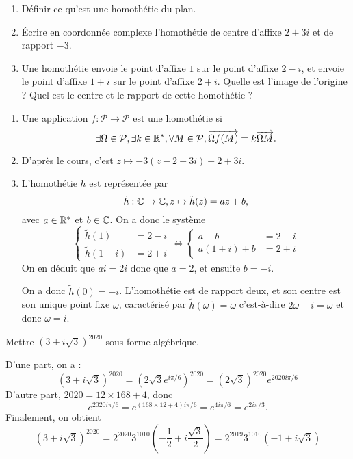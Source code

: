 \begin{exo}
\begin{enumerate}
\item Définir ce qu'est une homothétie du plan.
\item Écrire en coordonnée complexe l'homothétie de centre d'affixe $2+3i$ et de rapport $-3$.
\item Une homothétie envoie le point d'affixe $1$ sur le point d'affixe $2-i$, et envoie le point d'affixe $1+i$ sur le point d'affixe $2+i$. Quelle est l'image de l'origine ? Quel est le centre et le rapport de cette homothétie ?
\end{enumerate}
\begin{sol}
\begin{enumerate}
\item Une application $f : \mathcal P\to \mathcal P$ est une homothétie si
\[ \exists \Omega\in\mathcal P, \exists k\in\mathbb{R}^*, \forall M\in\mathcal P, \overrightarrow{\Omega f(M)}=k\overrightarrow{\Omega M}.\]
\item D'après le cours, c'est  $z\mapsto -3(z-2-3i)+2+3i$.
\item L'homothétie $h$ est représentée par 
\[ \tilde h : \mathbb{C}\to\mathbb{C}, z\mapsto \tilde h(z)=az+b,\]
avec $a\in \mathbb{R}^*$ et $b\in\mathbb{C}$. On a donc le système 
\[
\begin{cases}\tilde h(1)&=2-i\\ \tilde h(1+i)&=2+i\end{cases}
\iff
\begin{cases}
a+b&=2-i\\
a(1+i)+b&=2+i\end{cases}
\]
On en déduit que $ai=2i$ donc que $a=2$, et ensuite $b=-i$.

On a donc $\tilde h(0)=-i$. L'homothétie est de rapport deux, et son centre est son unique point fixe $\omega$, caractérisé par $\tilde h(\omega)=\omega$ c'est-à-dire $2\omega-i=\omega$ et donc $\omega=i$.
\end{enumerate}
\end{sol}
\end{exo}



\begin{exo}
Mettre $(3+i\sqrt 3)^{2020}$ sous forme algébrique.
\begin{sol}
D'une part, on a :
\[ 
(3+i\sqrt 3)^{2020}
=\left(2\sqrt 3 e^{i\pi/6}\right)^{2020} 
=(2\sqrt 3)^{2020}e^{2020i\pi/6}
\]
D'autre part, $2020 = 12\times 168 + 4$, donc
\[ e^{2020i\pi/6} = e^{(168\times 12+4)i\pi/6} = e^{4i\pi/6}=e^{2i\pi/3}.\]
Finalement, on obtient
\[ 
(3+i\sqrt 3)^{2020}
=2^{2020}3^{1010}\left(-\frac{1}{2}+i\frac{\sqrt 3}{2}\right)
=2^{2019}3^{1010}(-1+i\sqrt 3)
\]
\end{sol}
\end{exo}


